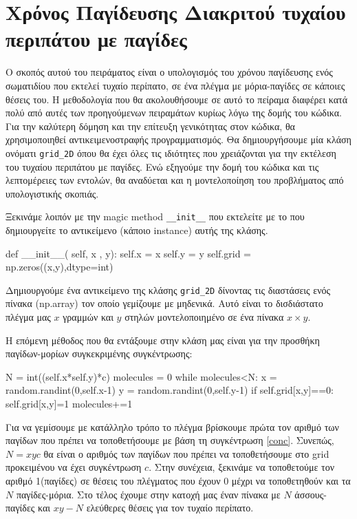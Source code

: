 \section{Χρόνος Παγίδευσης Διακριτού τυχαίου περιπάτου με παγίδες}
Ο σκοπός αυτού του πειράματος είναι ο υπολογισμός του χρόνου παγίδευσης ενός σωματιδίου που εκτελεί τυχαίο περίπατο, σε ένα πλέγμα με μόρια-παγίδες σε κάποιες θέσεις του. Η μεθοδολογία που θα ακολουθήσουμε σε αυτό το πείραμα διαφέρει κατά πολύ από αυτές των προηγούμενων πειραμάτων κυρίως λόγω της δομής του κώδικα. Για την καλύτερη δόμηση και την επίτευξη γενικότητας στον κώδικα, θα χρησιμοποιηθεί αντικειμενοστραφής προγραμματισμός. Θα δημιουργήσουμε μία κλάση ονόματι {\en \texttt{grid\_2D}} όπου θα έχει όλες τις ιδιότητες που χρειάζονται για την εκτέλεση του τυχαίου περιπάτου με παγίδες. Ενώ εξηγούμε την δομή του κώδικα και τις λεπτομέρειες των εντολών, θα αναδύεται και η μοντελοποίηση του προβλήματος από υπολογιστικής σκοπιάς.

Ξεκινάμε λοιπόν με την {\en magic method \texttt{\_\_init\_\_}} που εκτελείτε με το που δημιουργείτε το αντικείμενο (κάποιο {\en instance}) αυτής της κλάσης.
\en 
\begin{python}
def __init__( self, x , y):
    self.x = x
    self.y = y
    self.grid = np.zeros((x,y),dtype=int)
\end{python}
\gr 
Δημιουργούμε ένα αντικείμενο της κλάσης {\en \texttt{grid\_2D}} δίνοντας τις διαστάσεις ενός πίνακα ({\en np.array}) τον οποίο γεμίζουμε με μηδενικά. Αυτό είναι το δισδιάστατο πλέγμα μας $x$ γραμμών και $y$ στηλών μοντελοποιημένο σε ένα πίνακα $x \times y$. 

Η επόμενη μέθοδος που θα εντάξουμε στην κλάση μας είναι για την προσθήκη παγίδων-μορίων συγκεκριμένης συγκέντρωσης:
\en 
\begin{python}
N = int((self.x*self.y)*c)
molecules = 0
while molecules<N:
    x = random.randint(0,self.x-1)
    y = random.randint(0,self.y-1)
    if self.grid[x,y]==0:
        self.grid[x,y]=1
        molecules+=1
\end{python}
\gr
Για να γεμίσουμε με κατάλληλο τρόπο το πλέγμα βρίσκουμε πρώτα τον αριθμό των παγίδων που πρέπει να τοποθετήσουμε με βάση τη συγκέντρωση \eqref{conc}. Συνεπώς, $Ν=xyc$  θα είναι ο αριθμός των παγίδων που πρέπει να τοποθετήσουμε στο {\en grid} προκειμένου να έχει συγκέντρωση $c$. Στην συνέχεια, ξεκινάμε να τοποθετούμε τον αριθμό 1(παγίδες) σε θέσεις του πλέγματος που έχουν 0 μέχρι να τοποθετηθούν και τα $N$ παγίδες-μόρια. Στο τέλος έχουμε στην κατοχή μας έναν πίνακα με $Ν$ άσσους-παγίδες και $xy-N$ ελεύθερες θέσεις για τον τυχαίο περίπατο.


